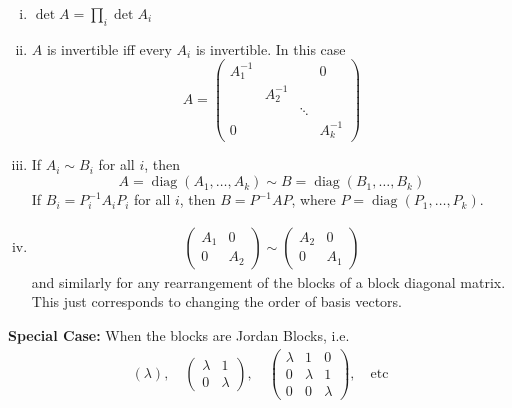 \documentclass{article}
\theoremstyle{definition} \newtheorem*{definition}{Definition}
\DeclareMathOperator{\diag}{diag}
\begin{document}
  \begin{remark}
    \begin{enumerate}[(i)]
      \item $\det A = \prod_i \det A_i$ 
      \item $A$ is invertible iff every $A_i$ is invertible. In this case
        \[
        A = \left( 
        \begin{matrix}
          A_1^{-1} &&&0\\
          &A_2^{-1}&&\\
          &&\ddots&\\
          0&&&A_k^{-1}
        \end{matrix}
        \right)
        \]
      \item If $A_i \sim B_i$ for all $i$, then
        \[
          A = \diag\left( A_1,\dots,A_k \right) \sim B = \diag
          \left( B_1,\dots,B_k \right)
        \]
        If $B_i=P_i^{-1}A_iP_i$ for all $i$, then $B=
        P^{-1}AP$, where $P=\diag\left( P_1,\dots,P_k \right)$.
      \item 
        \begin{align*}
          \left( 
          \begin{matrix}
            A_1 & 0\\
            0 & A_2
          \end{matrix}
          \right) \sim \left( 
          \begin{matrix}
            A_2 & 0\\
            0 & A_1
          \end{matrix}
          \right)
        \end{align*}
        and similarly for any rearrangement of the blocks of a block
        diagonal matrix. This just corresponds to changing the order of 
         basis vectors.

    \end{enumerate}
  \end{remark}
    \textbf{Special Case:} When the blocks are Jordan Blocks, i.e.
    \begin{align*}
      (\lambda),\quad \left( 
      \begin{matrix}
        \lambda & 1\\
        0 & \lambda
      \end{matrix}
      \right),\quad \left( 
      \begin{matrix}
      \lambda & 1 & 0\\
      0 & \lambda & 1\\
      0 & 0 & \lambda
      \end{matrix}
      \right), \quad \text{etc}
    \end{align*}
\end{document}
